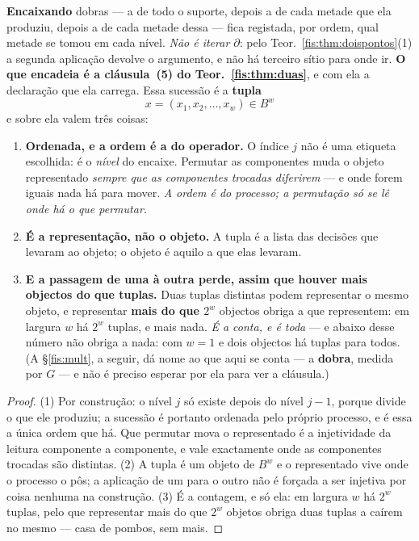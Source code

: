 \documentclass[livro.tex]{subfiles}
\begin{document}
\begin{teorema}\label{fis:thm:coord}
\textbf{Encaixando} dobras --- a de todo o suporte, depois a de cada metade que
ela produziu, depois a de cada metade dessa --- fica registada, por ordem, qual
metade se tomou em cada nível. \emph{Não é iterar $\partial$}: pelo
Teor.~\ref{fis:thm:doispontos}(1) a segunda aplicação devolve o argumento, e não
há terceiro sítio para onde ir. \textbf{O que encadeia é a cláusula~(5) do
Teor.~\ref{fis:thm:duas}}, e com ela a declaração que ela carrega. Essa sucessão
é a \textbf{tupla}
\[
\boxed{\;x=(x_1,x_2,\dots,x_w)\in B^{w}\;}
\]
e sobre ela valem três coisas:
\begin{enumerate}\itemsep3pt
\item[(1)] \textbf{Ordenada, e a ordem é a do operador.} O índice $j$ não é uma
etiqueta escolhida: é o \emph{nível} do encaixe. Permutar as componentes muda o
objeto representado \emph{sempre que as componentes trocadas diferirem} --- e
onde forem iguais nada há para mover. \emph{A ordem é do processo; a permutação
só se lê onde há o que permutar.}
\item[(2)] \textbf{É a representação, não o objeto.} A tupla é a lista das
decisões que levaram ao objeto; o objeto é aquilo a que elas levaram.
\item[(3)] \textbf{E a passagem de uma à outra perde, assim que houver mais
objectos do que tuplas.} Duas tuplas distintas podem representar o mesmo objeto,
e representar \textbf{mais do que $2^{w}$} objectos obriga a que representem: em
largura $w$ há $2^{w}$ tuplas, e mais nada. \emph{É a conta, e é toda} --- e
abaixo desse número não obriga a nada: com $w=1$ e dois objectos há tuplas para
todos. (A §\ref{fis:mult}, a seguir, dá nome ao que aqui se conta --- a
\textbf{dobra}, medida por $G$ --- e não é preciso esperar por ela para ver a
cláusula.)
\end{enumerate}
\end{teorema}

\begin{proof}
(1) Por construção: o nível $j$ só existe depois do nível $j-1$, porque divide o
que ele produziu; a sucessão é portanto ordenada pelo próprio processo, e é essa
a única ordem que há. Que permutar mova o representado é a injetividade da
leitura componente a componente, e vale exactamente onde as componentes trocadas
são distintas. (2) A tupla é um objeto de $B^{w}$ e o representado vive onde o
processo o pôs; a aplicação de um para o outro não é forçada a ser injetiva por
coisa nenhuma na construção. (3) É a contagem, e só ela: em largura $w$ há
$2^{w}$ tuplas, pelo que representar mais do que $2^{w}$ objetos obriga duas
tuplas a caírem no mesmo --- casa de pombos, sem mais.
\end{proof}
\end{document}
